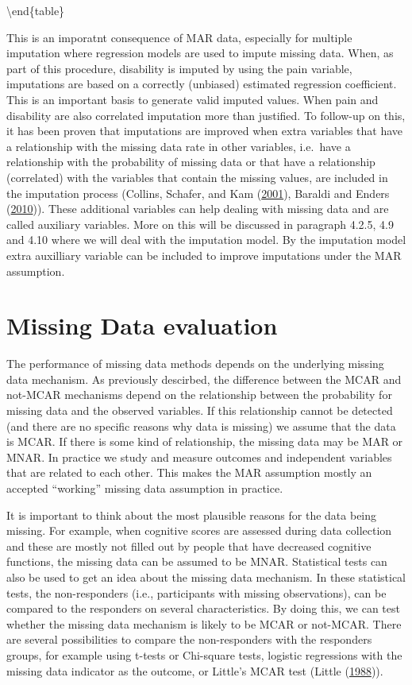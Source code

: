 \documentclass[
]{book}
\begin{document}
\textbackslash end\{table\}

This is an imporatnt consequence of MAR data, especially for multiple
imputation where regression models are used to impute missing data.
When, as part of this procedure, disability is imputed by using the pain
variable, imputations are based on a correctly (unbiased) estimated
regression coefficient. This is an important basis to generate valid
imputed values. When pain and disability are also correlated imputation
more than justified. To follow-up on this, it has been proven that
imputations are improved when extra variables that have a relationship
with the missing data rate in other variables, i.e.~have a relationship
with the probability of missing data or that have a relationship
(correlated) with the variables that contain the missing values, are
included in the imputation process (Collins, Schafer, and Kam
(\protect\hyperlink{ref-Collins2001}{2001}), Baraldi and Enders
(\protect\hyperlink{ref-Baraldi2010}{2010})). These additional variables
can help dealing with missing data and are called auxiliary variables.
More on this will be discussed in paragraph 4.2.5, 4.9 and 4.10 where we
will deal with the imputation model. By the imputation model extra
auxilliary variable can be included to improve imputations under the MAR
assumption.

\hypertarget{missing-data-evaluation-1}{%
\section{Missing Data evaluation}\label{missing-data-evaluation-1}}

The performance of missing data methods depends on the underlying
missing data mechanism. As previously descirbed, the difference between
the MCAR and not-MCAR mechanisms depend on the relationship between the
probability for missing data and the observed variables. If this
relationship cannot be detected (and there are no specific reasons why
data is missing) we assume that the data is MCAR. If there is some kind
of relationship, the missing data may be MAR or MNAR. In practice we
study and measure outcomes and independent variables that are related to
each other. This makes the MAR assumption mostly an accepted ``working''
missing data assumption in practice.

It is important to think about the most plausible reasons for the data
being missing. For example, when cognitive scores are assessed during
data collection and these are mostly not filled out by people that have
decreased cognitive functions, the missing data can be assumed to be
MNAR. Statistical tests can also be used to get an idea about the
missing data mechanism. In these statistical tests, the non-responders
(i.e., participants with missing observations), can be compared to the
responders on several characteristics. By doing this, we can test
whether the missing data mechanism is likely to be MCAR or not-MCAR.
There are several possibilities to compare the non-responders with the
responders groups, for example using t-tests or Chi-square tests,
logistic regressions with the missing data indicator as the outcome, or
Little's MCAR test (Little (\protect\hyperlink{ref-Little1988}{1988})).
\end{document}
